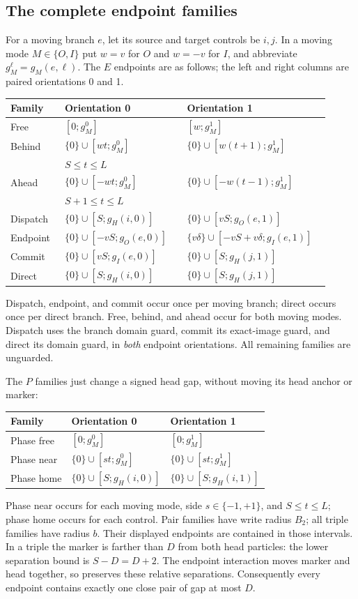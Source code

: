 \documentclass[11pt,a4paper]{article}
\numberwithin{equation}{section}
\begin{document}
\subsection{The complete endpoint families}
For a moving branch $e$, let its source and target controls be $i,j$. In a moving mode $M\in\{O,I\}$ put $w=v$ for $O$ and $w=-v$ for $I$, and abbreviate $g_M^\ell=g_M(e,\ell)$. The $E$ endpoints are as follows; the left and right columns are paired orientations 0 and 1.
\begin{longtable}{@{}p{0.16\linewidth}p{0.36\linewidth}p{0.39\linewidth}@{}}
\toprule
Family & Orientation 0 & Orientation 1\\\midrule\endhead
Free & $[0;g_M^0]$ & $[w;g_M^1]$\\[5pt]
Behind & $\{0\}\cup[wt;g_M^0]$ & $\{0\}\cup[w(t+1);g_M^1]$\\
& \multicolumn{2}{l}{$S\le t\le L$}\\[5pt]
Ahead & $\{0\}\cup[-wt;g_M^0]$ & $\{0\}\cup[-w(t-1);g_M^1]$\\
& \multicolumn{2}{l}{$S+1\le t\le L$}\\[5pt]
Dispatch & $\{0\}\cup[S;g_H(i,0)]$ & $\{0\}\cup[vS;g_O(e,1)]$\\[5pt]
Endpoint & $\{0\}\cup[-vS;g_O(e,0)]$ & $\{v\delta\}\cup[-vS+v\delta;g_I(e,1)]$\\[5pt]
Commit & $\{0\}\cup[vS;g_I(e,0)]$ & $\{0\}\cup[S;g_H(j,1)]$\\[5pt]
Direct & $\{0\}\cup[S;g_H(i,0)]$ & $\{0\}\cup[S;g_H(j,1)]$\\\bottomrule
\end{longtable}
Dispatch, endpoint, and commit occur once per moving branch; direct occurs once per direct branch. Free, behind, and ahead occur for both moving modes. Dispatch uses the branch domain guard, commit its exact-image guard, and direct its domain guard, in \emph{both} endpoint orientations. All remaining families are unguarded.

The $P$ families just change a signed head gap, without moving its head anchor or marker:
\begin{center}
\begin{tabular}{@{}lll@{}}\toprule
Family & Orientation 0 & Orientation 1\\\midrule
Phase free & $[0;g_M^0]$ & $[0;g_M^1]$\\
Phase near & $\{0\}\cup[st;g_M^0]$ & $\{0\}\cup[st;g_M^1]$\\
Phase home & $\{0\}\cup[S;g_H(i,0)]$ & $\{0\}\cup[S;g_H(i,1)]$\\\bottomrule
\end{tabular}
\end{center}
Phase near occurs for each moving mode, side $s\in\{-1,+1\}$, and $S\le t\le L$; phase home occurs for each control. Pair families have write radius $B_2$; all triple families have radius $b$. Their displayed endpoints are contained in those intervals. In a triple the marker is farther than $D$ from both head particles: the lower separation bound is $S-D=D+2$. The endpoint interaction moves marker and head together, so preserves these relative separations. Consequently every endpoint contains exactly one close pair of gap at most $D$.
\end{document}
